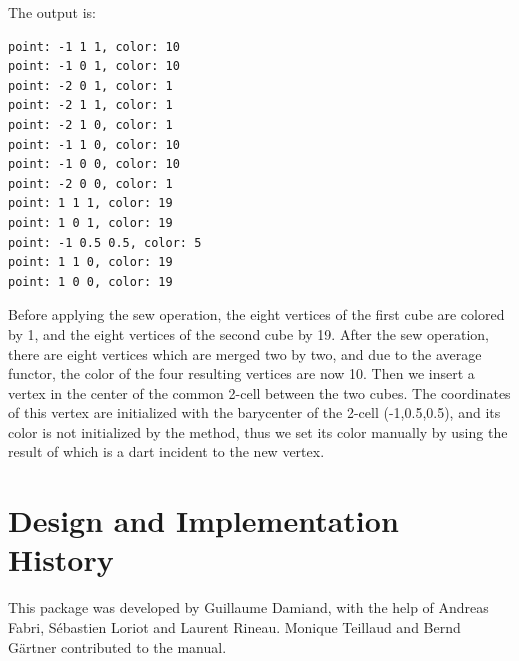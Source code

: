 
The output is:
\begin{verbatim}
point: -1 1 1, color: 10
point: -1 0 1, color: 10
point: -2 0 1, color: 1
point: -2 1 1, color: 1
point: -2 1 0, color: 1
point: -1 1 0, color: 10
point: -1 0 0, color: 10
point: -2 0 0, color: 1
point: 1 1 1, color: 19
point: 1 0 1, color: 19
point: -1 0.5 0.5, color: 5
point: 1 1 0, color: 19
point: 1 0 0, color: 19
\end{verbatim}

Before applying the sew operation, the eight vertices of the first
cube are colored by 1, and the eight vertices of the second cube by
19. After the sew operation, there are eight vertices which are merged
two by two, and due to the average functor, the color of the four
resulting vertices are now 10. Then we insert a vertex in the center
of the common 2-cell between the two cubes.  The coordinates of this
vertex are initialized with the barycenter of the 2-cell
(-1,0.5,0.5), and its color is not initialized by the method, thus we
set its color manually by using the result of
 which is a dart incident to the
new vertex.

\section{Design and Implementation History}

This package was developed by Guillaume Damiand, with the help of
Andreas Fabri, S\'ebastien Loriot and Laurent Rineau.  Monique
Teillaud and Bernd G{\"a}rtner contributed to the manual.
